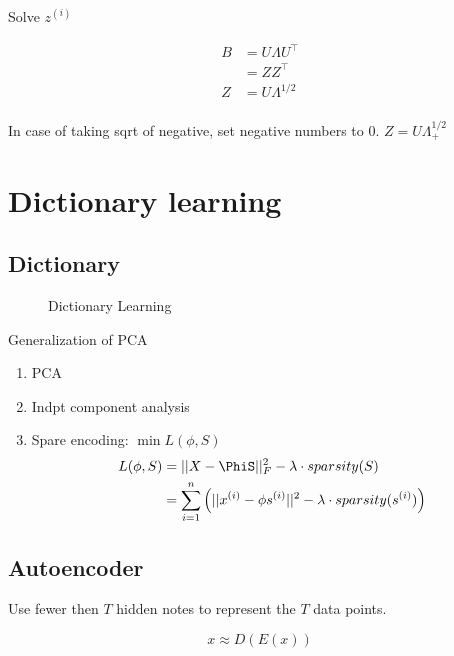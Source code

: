 \documentclass[a4paper]{report}
\begin{document}
Solve $z^{(i)}$

\begin{align*}
B &= U\Lambda U^\top \\
&= ZZ^\top \\
Z &= U\Lambda^{1/2} \\
\end{align*}

In case of taking sqrt of negative, set negative numbers to 0. $Z=U\Lambda_+^{1/2}$
\section{Dictionary learning}
\subsection{Dictionary}
\begin{figure}[!htp]
\centering
{}
\caption{Dictionary Learning}
\label{fig:dicLearn}
\end{figure}

Generalization of PCA
\begin{enumerate}
\item PCA
\item Indpt component analysis
\item Spare encoding: $\min L(\phi, S) $
\begin{align*}
L(\phi, S) &= ||X-\PhiS||_F^2 - \lambda\cdot sparsity(S) \\
&= \sum_{i=1}^n \Big(||x^{(i)}-\phi s^{(i)}||^2-\lambda\cdot sparsity(s^{(i)})\Big)
\end{align*}
\end{enumerate}

\subsection{Autoencoder}
Use fewer then $T$ hidden notes to represent the $T$ data points. 

$$
x \approx D(E(x))
$$
\end{document}
